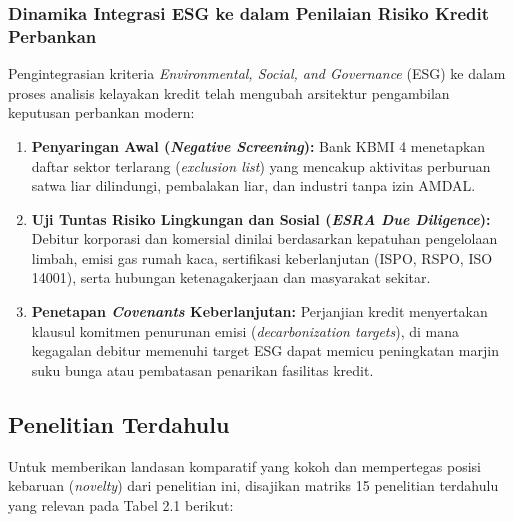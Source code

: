 \documentclass[12pt,a4paper]{article}
\numberwithin{equation}{section}
\begin{document}
\subsubsection{Dinamika Integrasi ESG ke dalam Penilaian Risiko Kredit Perbankan}
\noindent
Pengintegrasian kriteria \emph{Environmental, Social, and Governance} (ESG) ke dalam proses analisis kelayakan kredit telah mengubah arsitektur pengambilan keputusan perbankan modern:
\begin{enumerate}
  \item \textbf{Penyaringan Awal (\emph{Negative Screening}):} Bank KBMI 4 menetapkan daftar sektor terlarang (\emph{exclusion list}) yang mencakup aktivitas perburuan satwa liar dilindungi, pembalakan liar, dan industri tanpa izin AMDAL.
  \item \textbf{Uji Tuntas Risiko Lingkungan dan Sosial (\emph{ESRA Due Diligence}):} Debitur korporasi dan komersial dinilai berdasarkan kepatuhan pengelolaan limbah, emisi gas rumah kaca, sertifikasi keberlanjutan (ISPO, RSPO, ISO 14001), serta hubungan ketenagakerjaan dan masyarakat sekitar.
  \item \textbf{Penetapan \emph{Covenants} Keberlanjutan:} Perjanjian kredit menyertakan klausul komitmen penurunan emisi (\emph{decarbonization targets}), di mana kegagalan debitur memenuhi target ESG dapat memicu peningkatan marjin suku bunga atau pembatasan penarikan fasilitas kredit.
\end{enumerate}

\subsection{Penelitian Terdahulu}

\noindent
Untuk memberikan landasan komparatif yang kokoh dan mempertegas posisi kebaruan (\emph{novelty}) dari penelitian ini, disajikan matriks 15 penelitian terdahulu yang relevan pada Tabel 2.1 berikut:
\end{document}
